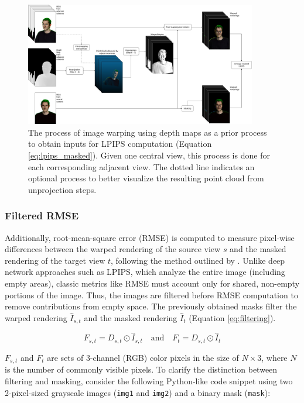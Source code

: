 \begin{figure}
	\centering
	\includegraphics[width=0.9\textwidth]{Figures/methods/lpips.jpg}
	\caption{The process of image warping using depth maps as a prior process to obtain inputs for LPIPS computation (Equation \ref{eq:lpips_masked}). Given one central view, this process is done for each corresponding adjacent view. The dotted line indicates an optional process to better visualize the resulting point cloud from unprojection steps.}
	\label{fig:point_warping}
\end{figure}

\subsubsection{Filtered RMSE}
Additionally, root-mean-square error (RMSE) is computed to measure pixel-wise differences between the warped rendering of the source view $s$ and the masked rendering of the target view $t$, following the method outlined by \textcite{Liu.2024}. Unlike deep network approaches such as LPIPS, which analyze the entire image (including empty areas), classic metrics like RMSE must account only for shared, non-empty portions of the image. Thus, the images are filtered before RMSE computation to remove contributions from empty space. The previously obtained masks filter the warped rendering $\hat{I}_{s,t}$ and the masked rendering $\hat{I}_t$ (Equation \ref{eq:filtering}).

\begin{equation}
	\label{eq:filtering}
	F_{s,t} = D_{s,t} \odot \hat{I}_{s,t} \quad \text{and} \quad F_t = D_{s,t} \odot \hat{I}_t
\end{equation}

$F_{s,t}$ and $F_t$ are sets of 3-channel (RGB) color pixels in the size of $N \times 3$, where $N$ is the number of commonly visible pixels. To clarify the distinction between filtering and masking, consider the following Python-like code snippet using two 2-pixel-sized grayscale images (\texttt{img1} and \texttt{img2}) and a binary mask (\texttt{mask}):

